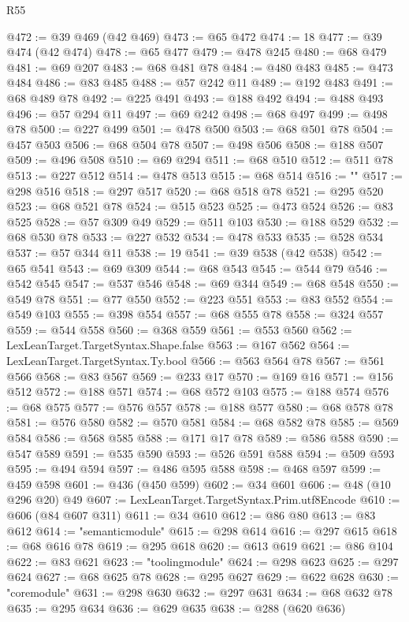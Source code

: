\begin{lexlean}{R55}
\begin{coremodule}
{@472 := @39 @469 (@42 @469)
@473 := @65 @472
@474 := 18
@477 := @39 @474 (@42 @474)
@478 := @65 @477
@479 := @478 @245
@480 := @68 @479
@481 := @69 @207
@483 := @68 @481 @78
@484 := @480 @483
@485 := @473 @484
@486 := @83 @485
@488 := @57 @242 @11
@489 := @192 @483
@491 := @68 @489 @78
@492 := @225 @491
@493 := @188 @492
@494 := @488 @493
@496 := @57 @294 @11
@497 := @69 @242
@498 := @68 @497
@499 := @498 @78
@500 := @227 @499
@501 := @478 @500
@503 := @68 @501 @78
@504 := @457 @503
@506 := @68 @504 @78
@507 := @498 @506
@508 := @188 @507
@509 := @496 @508
@510 := @69 @294
@511 := @68 @510
@512 := @511 @78
@513 := @227 @512
@514 := @478 @513
@515 := @68 @514
@516 := "{"
@517 := @298 @516
@518 := @297 @517
@520 := @68 @518 @78
@521 := @295 @520
@523 := @68 @521 @78
@524 := @515 @523
@525 := @473 @524
@526 := @83 @525
@528 := @57 @309 @49
@529 := @511 @103
@530 := @188 @529
@532 := @68 @530 @78
@533 := @227 @532
@534 := @478 @533
@535 := @528 @534
@537 := @57 @344 @11
@538 := 19
@541 := @39 @538 (@42 @538)
@542 := @65 @541
@543 := @69 @309
@544 := @68 @543
@545 := @544 @79
@546 := @542 @545
@547 := @537 @546
@548 := @69 @344
@549 := @68 @548
@550 := @549 @78
@551 := @77 @550
@552 := @223 @551
@553 := @83 @552
@554 := @549 @103
@555 := @398 @554
@557 := @68 @555 @78
@558 := @324 @557
@559 := @544 @558
@560 := @368 @559
@561 := @553 @560
@562 := LexLeanTarget.TargetSyntax.Shape.false
@563 := @167 @562
@564 := LexLeanTarget.TargetSyntax.Ty.bool
@566 := @563 @564 @78
@567 := @561 @566
@568 := @83 @567
@569 := @233 @17
@570 := @169 @16
@571 := @156 @512
@572 := @188 @571
@574 := @68 @572 @103
@575 := @188 @574
@576 := @68 @575
@577 := @576 @557
@578 := @188 @577
@580 := @68 @578 @78
@581 := @576 @580
@582 := @570 @581
@584 := @68 @582 @78
@585 := @569 @584
@586 := @568 @585
@588 := @171 @17 @78
@589 := @586 @588
@590 := @547 @589
@591 := @535 @590
@593 := @526 @591 @588
@594 := @509 @593
@595 := @494 @594
@597 := @486 @595 @588
@598 := @468 @597
@599 := @459 @598
@601 := @436 (@450 @599)
@602 := @34 @601
@606 := @48 (@10 @296 @20) @49
@607 := LexLeanTarget.TargetSyntax.Prim.utf8Encode
@610 := @606 (@84 @607 @311)
@611 := @34 @610
@612 := @86 @80
@613 := @83 @612
@614 := "semanticmodule"
@615 := @298 @614
@616 := @297 @615
@618 := @68 @616 @78
@619 := @295 @618
@620 := @613 @619
@621 := @86 @104
@622 := @83 @621
@623 := "toolingmodule"
@624 := @298 @623
@625 := @297 @624
@627 := @68 @625 @78
@628 := @295 @627
@629 := @622 @628
@630 := "coremodule"
@631 := @298 @630
@632 := @297 @631
@634 := @68 @632 @78
@635 := @295 @634
@636 := @629 @635
@638 := @288 (@620 @636)
}}
\end{coremodule}
\end{lexlean}
